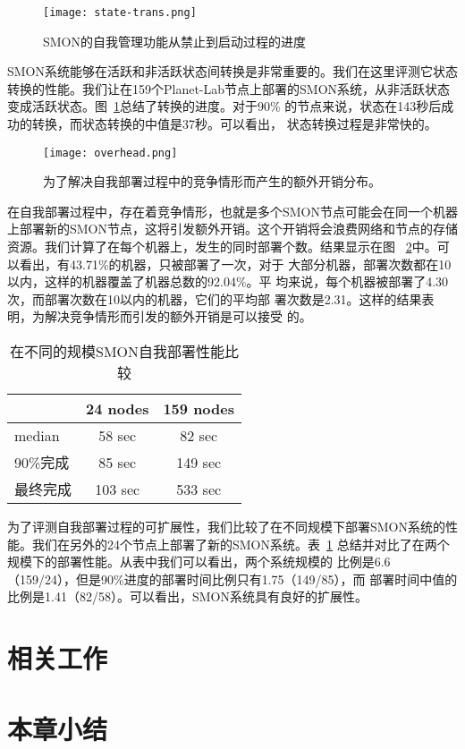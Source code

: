 \begin{figure}
\centering
  \begin{minipage}{0.8\linewidth}
    \centering
    \texttt{[image: state-trans.png]}
    \caption{SMON的自我管理功能从禁止到启动过程的进度}
    \label{fig:state-transition}
  \end{minipage}
\end{figure}

SMON系统能够在活跃和非活跃状态间转换是非常重要的。我们在这里评测它状态
转换的性能。我们让在159个Planet-Lab节点上部署的SMON系统，从非活跃状态
变成活跃状态。图~\ref{fig:state-transition}总结了转换的进度。对于90\%
的节点来说，状态在143秒后成功的转换，而状态转换的中值是37秒。可以看出，
状态转换过程是非常快的。

\begin{figure}
\centering
  \begin{minipage}{0.8\linewidth}
    \centering
    \texttt{[image: overhead.png]}
    \caption{为了解决自我部署过程中的竞争情形而产生的额外开销分布。}
    \label{fig:overhead}
  \end{minipage}
\end{figure}

在自我部署过程中，存在着竞争情形，也就是多个SMON节点可能会在同一个机器
上部署新的SMON节点，这将引发额外开销。这个开销将会浪费网络和节点的存储
资源。我们计算了在每个机器上，发生的同时部署个数。结果显示在图~
\ref{fig:overhead}中。可以看出，有43.71\%的机器，只被部署了一次，对于
大部分机器，部署次数都在10以内，这样的机器覆盖了机器总数的92.04\%。平
均来说，每个机器被部署了4.30次，而部署次数在10以内的机器，它们的平均部
署次数是2.31。这样的结果表明，为解决竞争情形而引发的额外开销是可以接受
的。

\begin{table}
\centering
  \begin{minipage}{0.8\linewidth}
    \centering
    \caption{在不同的规模SMON自我部署性能比较}
    \label{fig:scalability}
    \begin{tabular}{|l|c|c|}
    \hline
           & 24 nodes & 159 nodes\\
    \hline
    median & 58 sec & 82 sec \\
    \hline
    90\%完成 & 85 sec & 149 sec\\
    \hline
    最终完成 & 103 sec & 533 sec\\
    \hline
    \end{tabular}
  \end{minipage}
\end{table}

为了评测自我部署过程的可扩展性，我们比较了在不同规模下部署SMON系统的性
能。我们在另外的24个节点上部署了新的SMON系统。表~\ref{fig:scalability}
总结并对比了在两个规模下的部署性能。从表中我们可以看出，两个系统规模的
比例是6.6（159/24），但是90\%进度的部署时间比例只有1.75（149/85），而
部署时间中值的比例是1.41（82/58）。可以看出，SMON系统具有良好的扩展性。

\section{相关工作}
\label{sec:smon_related}

\section{本章小结}
\label{sec:smon_conclusion}
